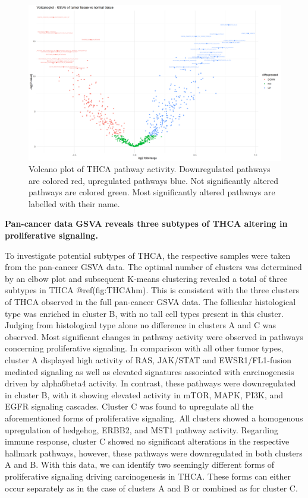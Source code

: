 \documentclass[
  parskip,
  oneside]{scrreprt}
\begin{document}
\begin{figure}

{\centering \includegraphics[width=1\linewidth]{figures/Volcanoplot THCA GSVA data} 

}

\caption{Volcano plot of THCA pathway activity. Downregulated pathways are colored red, upregulated pathways blue. Not significantly altered pathways are colored green. Most significantly altered pathways are labelled with their name.}\label{fig:THCAvolcano}
\end{figure}

\textbf{Pan-cancer data GSVA reveals three subtypes of THCA altering in
proliferative signaling.}

To investigate potential subtypes of THCA, the respective samples were
taken from the pan-cancer GSVA data. The optimal number of clusters was
determined by an elbow plot and subsequent K-means clustering revealed a
total of three subtypes in THCA @ref(fig:THCAhm). This is consistent
with the three clusters of THCA observed in the full pan-cancer GSVA
data. The follicular histological type was enriched in cluster B, with
no tall cell types present in this cluster. Judging from histological
type alone no difference in clusters A and C was observed. Most
significant changes in pathway activity were observed in pathways
concerning proliferative signaling. In comparison with all other tumor
types, cluster A displayed high activity of RAS, JAK/STAT and
EWSR1/FL1-fusion mediated signaling as well as elevated signatures
associated with carcinogenesis driven by alpha6beta4 activity. In
contrast, these pathways were downregulated in cluster B, with it
showing elevated activity in mTOR, MAPK, PI3K, and EGFR signaling
cascades. Cluster C was found to upregulate all the aforementioned forms
of proliferative signaling. All clusters showed a homogenous
upregulation of hedgehog, ERBB2, and MST1 pathway activity. Regarding
immune response, cluster C showed no significant alterations in the
respective hallmark pathways, however, these pathways were downregulated
in both clusters A and B. With this data, we can identify two seemingly
different forms of proliferative signaling driving carcinogenesis in
THCA. These forms can either occur separately as in the case of clusters
A and B or combined as for cluster C.
\end{document}
